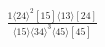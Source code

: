 \documentclass[varwidth, border=5pt]{standalone}
\begin{document}
\begin{my}
$\begin{gathered}
\scriptscriptstyle\frac{1⟨24⟩^2[15]⟨13⟩[24]}{⟨15⟩⟨34⟩^3⟨45⟩[45]}
\end{gathered}$
\end{my}
\end{document}
